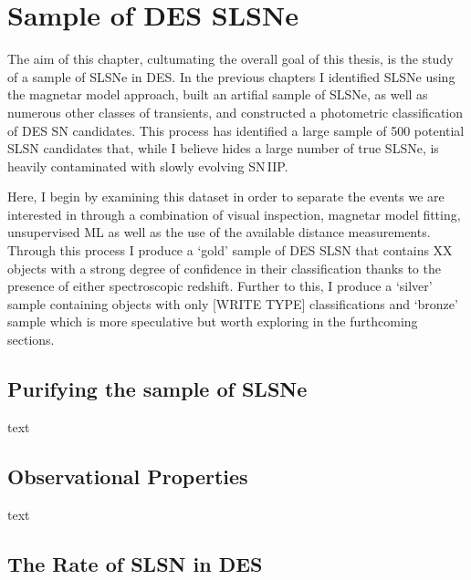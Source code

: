 \chapter{Sample of DES SLSNe}
\label{Chapter6}

The aim of this chapter, cultumating the overall goal of this thesis, is the study of a sample of SLSNe in DES. In the previous chapters I identified SLSNe using the magnetar model approach, built an artifial sample of SLSNe, as well as numerous other classes of transients, and constructed a photometric classification of DES SN candidates. This process has identified a large sample of 500 potential SLSN candidates that, while I believe hides a large number of true SLSNe, is heavily contaminated with slowly evolving SN\,IIP.

Here, I begin by examining this dataset in order to separate the events we are interested in through a combination of visual inspection, magnetar model fitting, unsupervised ML as well as the use of the available distance measurements. Through this process I produce a `gold' sample of DES SLSN that contains XX objects with a strong degree of confidence in their classification thanks to the presence of either spectroscopic redshift. Further to this, I produce a `silver' sample containing objects with only [WRITE TYPE] classifications and `bronze' sample which is more speculative but worth exploring in the furthcoming sections.

\section{Purifying the sample of SLSNe}
text

\section{Observational Properties}
text

\section{The Rate of SLSN in DES}
